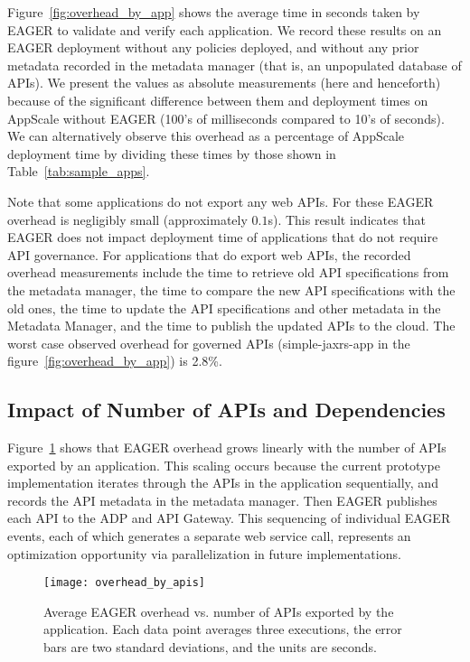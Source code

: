 Figure~\ref{fig:overhead_by_app} shows the average time in seconds taken by EAGER to validate and 
verify each application.  We record these results on an EAGER deployment without any policies 
deployed, and without any prior metadata recorded in the metadata manager 
(that is, an unpopulated database of APIs).
We present the values as absolute measurements (here and henceforth) because
of the significant difference between them and 
deployment times on AppScale without EAGER (100's of milliseconds compared to 10's of seconds).  
We can alternatively observe this overhead as a 
percentage of AppScale deployment time by dividing these times by 
those shown in Table~\ref{tab:sample_apps}.

Note that some applications do not export any web APIs.
For these EAGER overhead is negligibly small (approximately $0.1$s). 
This result indicates that EAGER does not impact deployment time of applications 
that do not require API governance.  For applications that do
export web APIs, the recorded overhead measurements include the time
to retrieve old API specifications from the metadata manager, the time 
to compare the new API specifications with the old ones, the time to
update the API specifications and other metadata in the Metadata Manager, and
the time to publish the updated APIs to the cloud.  
The worst case observed overhead for governed APIs (simple-jaxrs-app in the
figure~\ref{fig:overhead_by_app}) is 2.8\%.

\subsection{Impact of Number of APIs and Dependencies}

Figure~\ref{fig:overhead_by_apis} shows that EAGER overhead grows linearly
with the number of APIs exported by an application.  This scaling occurs
because the current prototype implementation iterates through the APIs in the
application sequentially, and records the API metadata in the metadata manager.
Then EAGER publishes each API to the ADP and API Gateway. This sequencing of
individual EAGER events, each of which generates a separate web service call,
represents an optimization opportunity via parallelization in future implementations.

\begin{figure}
\centering
\texttt{[image: overhead\_by\_apis]}
\caption{Average EAGER overhead vs. number of APIs exported by the
application.  Each data point averages three executions, the error bars 
are two standard deviations, and the units are seconds.}
\label{fig:overhead_by_apis}
\end{figure}

